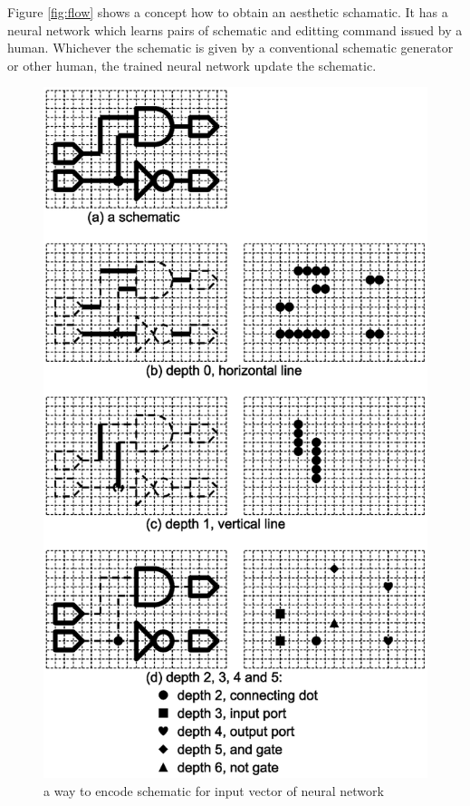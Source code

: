 \documentclass[twocolumn]{article}
\begin{document}
Figure {\ref{fig:flow}} shows a concept how to obtain an aesthetic schamatic.
It has a neural network which learns pairs of schematic and editting command
issued by a human.
Whichever the schematic is given by a conventional schematic generator
or other human,
the trained neural network update the schematic.

\begin{figure}[tb]
 \begin{center}
  \begin{minipage}{\hsize}
   \includegraphics[width=\hsize]{input_encode_03.eps}
   \caption{a way to encode schematic for input vector of neural network}
   \label{fig:input_encode}
  \end{minipage}
 \end{center}
\end{figure}
\end{document}
